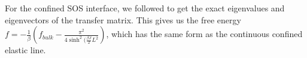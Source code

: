 For the confined SOS interface, we followed \cite{svrakic_finite-size_1988} to get the exact eigenvalues and eigenvectors of the transfer matrix. This gives us the free energy $f = -\frac{1}{\beta} \left( f_{bulk} - \frac{\pi^2}{4 \sinh^2(\frac{\beta J}{2} L^2 } \right)$, which has the same form as the continuous confined elastic line. 
